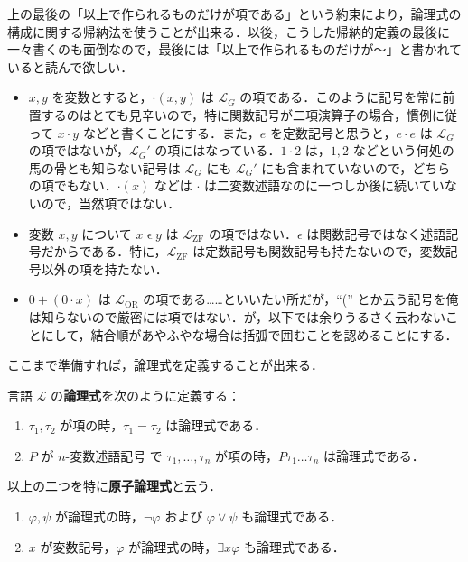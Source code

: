 \documentclass[a4j,xelatex,ja=standard]{ltjsarticle}
\begin{document}
上の最後の「以上で作られるものだけが項である」という約束により，論理式の構成に関する帰納法を使うことが出来る．以後，こうした帰納的定義の最後に一々書くのも面倒なので，最後には「以上で作られるものだけが〜」と書かれていると読んで欲しい．

\begin{example}
 \begin{itemize}
  \item $x, y$ を変数とすると，$\mathord{\cdot}(x, y)$ は $\mathcal{L}_G$ の項である．このように記号を常に前置するのはとても見辛いので，特に関数記号が二項演算子の場合，慣例に従って $x \cdot y$ などと書くことにする．また，$e$ を定数記号と思うと，$e \cdot e$ は $\mathcal{L}_G$ の項ではないが，$\mathcal{L}_G'$ の項にはなっている．$1 \cdot 2$ は，$1, 2$ などという何処の馬の骨とも知らない記号は $\mathcal{L}_G$ にも $\mathcal{L}_G'$ にも含まれていないので，どちらの項でもない．$\cdot(x)$ などは $\cdot$ は二変数述語なのに一つしか後に続いていないので，当然項ではない．
  \item 変数 $x, y$ について $x \mathrel{\epsilon} y$ は $\mathcal{L}_{\mathrm{ZF}}$ の項ではない．$\epsilon$ は関数記号ではなく述語記号だからである．特に，$\mathcal{L}_{\mathrm{ZF}}$ は定数記号も関数記号も持たないので，変数記号以外の項を持たない．
  \item $0 + (0 \cdot x)$ は $\mathcal{L}_{\mathrm{OR}}$ の項である……といいたい所だが，``('' とか云う記号を俺は知らないので厳密には項ではない．が，以下では余りうるさく云わないことにして，結合順があやふやな場合は括弧で囲むことを認めることにする．
 \end{itemize}
\end{example}

ここまで準備すれば，論理式を定義することが出来る．

\begin{definition}[論理式]
 言語 $\mathcal{L}$ の{\bfseries 論理式}を次のように定義する：
 \begin{enumerate}
  \item $\tau_1, \tau_2$ が項の時，$\tau_1 = \tau_2$ は論理式である．
  \item $P$ が $n$-変数述語記号 で $\tau_1, \dots, \tau_n$ が項の時，$P \tau_1 \dots \tau_n$ は論理式である．
 \end{enumerate} 
 以上の二つを特に{\bfseries 原子論理式}と云う．
 \begin{enumerate}[start=3]
  \item $\varphi, \psi$ が論理式の時，$\neg \varphi$ および $\varphi \vee \psi$ も論理式である．
  \item $x$ が変数記号，$\varphi$ が論理式の時，$\exists x \varphi$ も論理式である．
 \end{enumerate}
\end{definition}
\end{document}
